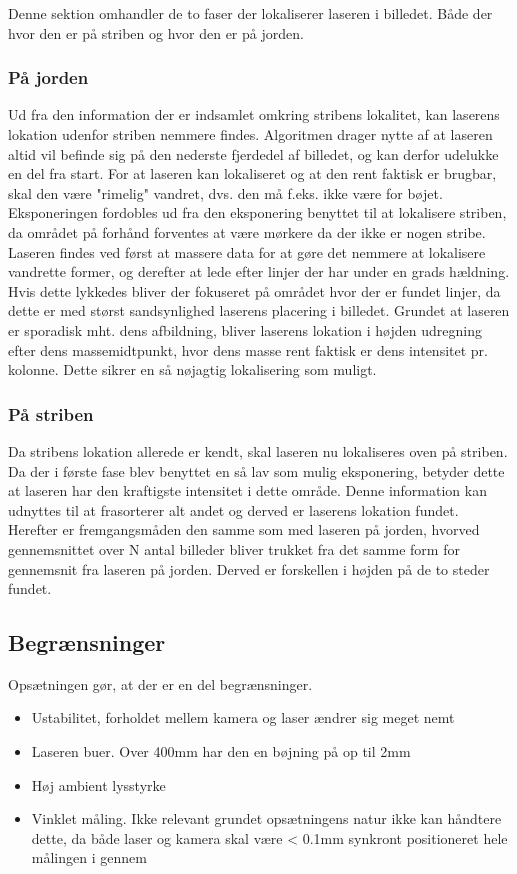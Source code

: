 Denne sektion omhandler de to faser der lokaliserer laseren i billedet. Både der hvor den er på striben og hvor den er på jorden.

\subsubsection{På jorden}
Ud fra den information der er indsamlet omkring stribens lokalitet, kan laserens lokation udenfor striben nemmere findes.
Algoritmen drager nytte af at laseren altid vil befinde sig på den nederste fjerdedel af billedet, og kan derfor udelukke en del fra start.
For at laseren kan lokaliseret og at den rent faktisk er brugbar, skal den være "rimelig" vandret, dvs. den må f.eks. ikke være for bøjet.
Eksponeringen fordobles ud fra den eksponering benyttet til at lokalisere striben, da området på forhånd forventes at være mørkere da der ikke er nogen stribe.
Laseren findes ved først at massere data for at gøre det nemmere at lokalisere vandrette former, og derefter at lede efter linjer der har under en grads hældning.
Hvis dette lykkedes bliver der fokuseret på området hvor der er fundet linjer, da dette er med størst sandsynlighed laserens placering i billedet.
Grundet at laseren er sporadisk mht. dens afbildning, bliver laserens lokation i højden udregning efter dens massemidtpunkt,
hvor dens masse rent faktisk er dens intensitet pr. kolonne. Dette sikrer en så nøjagtig lokalisering som muligt.

\subsubsection{På striben}
Da stribens lokation allerede er kendt, skal laseren nu lokaliseres oven på striben. Da der i første fase blev benyttet en så lav som mulig eksponering, betyder dette at laseren har den kraftigste intensitet i dette område. Denne information kan udnyttes til at frasorterer alt andet og derved er laserens lokation fundet. Herefter er fremgangsmåden den samme som med laseren på jorden, hvorved gennemsnittet over N antal billeder bliver trukket fra det samme form for gennemsnit fra laseren på jorden. Derved er forskellen i højden på de to steder fundet.

\subsection{Begrænsninger}
Opsætningen gør, at der er en del begrænsninger.
\begin{itemize}
	\item Ustabilitet, forholdet mellem kamera og laser ændrer sig meget nemt
	\item Laseren buer. Over 400mm har den en bøjning på op til 2mm
	\item Høj ambient lysstyrke
	\item Vinklet måling. Ikke relevant grundet opsætningens natur ikke kan håndtere dette, da både laser og kamera skal være < 0.1mm synkront positioneret hele målingen i gennem
\end{itemize}

